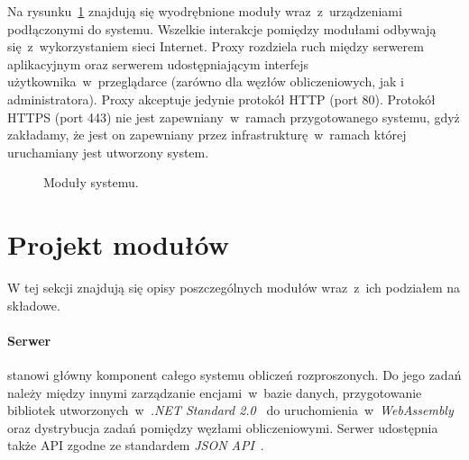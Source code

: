 \documentclass[a4paper,11pt,twoside]{report}
\theoremstyle{definition}
\begin{document}
Na rysunku~\ref{project-model} znajdują się wyodrębnione moduły wraz~z~urządzeniami podłączonymi do systemu.
Wszelkie interakcje pomiędzy modułami odbywają się~z~wykorzystaniem sieci Internet.
Proxy rozdziela ruch między serwerem aplikacyjnym oraz serwerem udostępniającym interfejs użytkownika~w~przeglądarce (zarówno dla węzłów obliczeniowych, jak i administratora).
Proxy akceptuje jedynie protokół HTTP (port 80).
Protokół HTTPS (port 443) nie jest zapewniany~w~ramach przygotowanego systemu, gdyż zakładamy, że jest on zapewniany przez infrastrukturę~w~ramach której uruchamiany jest utworzony system.


\begin{figure} 
    \caption{Moduły systemu.}
    \label{project-model}
\end{figure}

\section{Projekt modułów}
\label{projekt-modulow}

W tej sekcji znajdują się opisy poszczególnych modułów wraz~z~ich podziałem na składowe.

\paragraph{Serwer}

stanowi główny komponent całego systemu obliczeń rozproszonych. Do jego zadań należy między innymi zarządzanie encjami~w~bazie danych, przygotowanie bibliotek utworzonych~w~\textit{.NET Standard 2.0}~\cite{dotnet-standard} do uruchomienia~w~\textit{WebAssembly}~\cite{webassembly} oraz dystrybucja zadań pomiędzy węzłami obliczeniowymi. Serwer udostępnia także API zgodne ze standardem \textit{JSON API}~\cite{jsonapi}.
\end{document}
